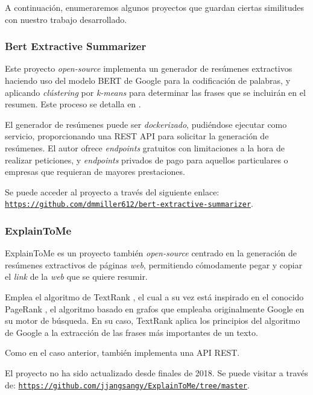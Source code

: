 
A continuación, enumeraremos algunos proyectos que guardan ciertas similitudes con nuestro trabajo desarrollado.

\subsubsection{Bert Extractive Summarizer}

Este proyecto \emph{open-source} implementa un generador de resúmenes extractivos haciendo uso del modelo BERT \cite{devlin19} de Google para la codificación de palabras, y aplicando \emph{clústering} por \emph{k-means} para determinar las frases que se incluirán en el resumen. Este proceso se detalla en \cite{miller19}.

El generador de resúmenes puede ser \emph{dockerizado}, pudiéndose ejecutar como servicio, proporcionando una REST API para solicitar la generación de resúmenes. El autor ofrece \emph{endpoints} gratuitos con limitaciones a la hora de realizar peticiones, y \emph{endpoints} privados de pago para aquellos particulares o empresas que requieran de mayores prestaciones.

Se puede acceder al proyecto a través del siguiente enlace: \\
\href{https://github.com/dmmiller612/bert-extractive-summarizer}{\texttt{{\small https://github.com/dmmiller612/bert-extractive-summarizer}}}.


\bigskip
\subsubsection{ExplainToMe}

ExplainToMe es un proyecto también \emph{open-source} centrado en la generación de resúmenes extractivos de páginas \emph{web}, permitiendo cómodamente pegar y copiar el \emph{link} de la \emph{web} que se quiere resumir.

Emplea el algoritmo de TextRank \cite{mihalce04}, el cual a su vez está inspirado en el conocido PageRank \cite{page99}, el algoritmo basado en grafos que empleaba originalmente Google en su motor de búsqueda. En su caso, TextRank aplica los principios del algoritmo de Google a la extracción de las frases más importantes de un texto.

Como en el caso anterior, también implementa una API REST.

El proyecto no ha sido actualizado desde finales de 2018. Se puede visitar a través de:
\href{https://github.com/jjangsangy/ExplainToMe/tree/master}{\texttt{{\small https://github.com/jjangsangy/ExplainToMe/tree/master}}}.


